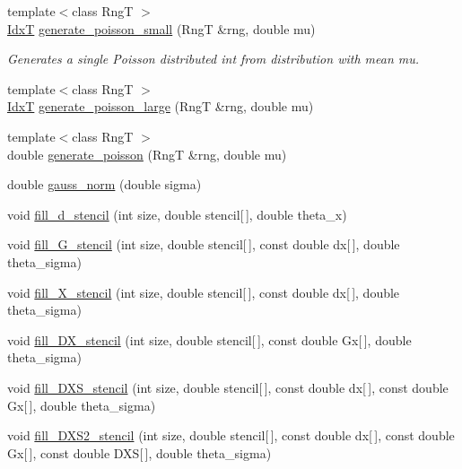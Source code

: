 \begin{DoxyCompactItemize}
\item 
{\footnotesize template$<$class RngT $>$ }\\\hyperlink{namespacemappel_ab17ec0f30b61ece292439d7ece81d3a8}{IdxT} \hyperlink{namespacemappel_af5deeb186fbcfbd0f449064cc70e8a86}{generate\+\_\+poisson\+\_\+small} (RngT \&rng, double mu)
\begin{DoxyCompactList}\small\item\em Generates a single Poisson distributed int from distribution with mean mu. \end{DoxyCompactList}\item 
{\footnotesize template$<$class RngT $>$ }\\\hyperlink{namespacemappel_ab17ec0f30b61ece292439d7ece81d3a8}{IdxT} \hyperlink{namespacemappel_ae776a0d92c466702788b7405a4a166e0}{generate\+\_\+poisson\+\_\+large} (RngT \&rng, double mu)
\item 
{\footnotesize template$<$class RngT $>$ }\\double \hyperlink{namespacemappel_adc1e3a6c0fd4804406d162c48d805d44}{generate\+\_\+poisson} (RngT \&rng, double mu)
\item 
double \hyperlink{namespacemappel_afdf826a9bc6ea906415c89f1e7087f1a}{gauss\+\_\+norm} (double sigma)
\item 
void \hyperlink{namespacemappel_a0bd2fc62ed44e755a6777d1209fe6bac}{fill\+\_\+d\+\_\+stencil} (int size, double stencil\mbox{[}$\,$\mbox{]}, double theta\+\_\+x)
\item 
void \hyperlink{namespacemappel_a5ca82edc201e8605107a991493ad0d5e}{fill\+\_\+\+G\+\_\+stencil} (int size, double stencil\mbox{[}$\,$\mbox{]}, const double dx\mbox{[}$\,$\mbox{]}, double theta\+\_\+sigma)
\item 
void \hyperlink{namespacemappel_ab6a11cd06ff348138cb04635b03a6de2}{fill\+\_\+\+X\+\_\+stencil} (int size, double stencil\mbox{[}$\,$\mbox{]}, const double dx\mbox{[}$\,$\mbox{]}, double theta\+\_\+sigma)
\item 
void \hyperlink{namespacemappel_ad2dd4330fc626fa673a3acf691d6b9a7}{fill\+\_\+\+D\+X\+\_\+stencil} (int size, double stencil\mbox{[}$\,$\mbox{]}, const double Gx\mbox{[}$\,$\mbox{]}, double theta\+\_\+sigma)
\item 
void \hyperlink{namespacemappel_ab0cb62f6dcecae5ff19468d87a283e7a}{fill\+\_\+\+D\+X\+S\+\_\+stencil} (int size, double stencil\mbox{[}$\,$\mbox{]}, const double dx\mbox{[}$\,$\mbox{]}, const double Gx\mbox{[}$\,$\mbox{]}, double theta\+\_\+sigma)
\item 
void \hyperlink{namespacemappel_a445e83c8273da9b3a50cc10d038ed612}{fill\+\_\+\+D\+X\+S2\+\_\+stencil} (int size, double stencil\mbox{[}$\,$\mbox{]}, const double dx\mbox{[}$\,$\mbox{]}, const double Gx\mbox{[}$\,$\mbox{]}, const double D\+XS\mbox{[}$\,$\mbox{]}, double theta\+\_\+sigma)

\end{DoxyCompactItemize}
